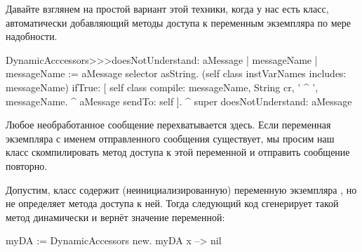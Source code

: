 \documentclass[a4paper,10pt,twoside]{book}
\begin{document}

Давайте взглянем на простой вариант этой техники, когда у нас есть класс, автоматически добавляющий методы доступа к переменным экземпляра по мере надобности.

\begin{code}{}
DynamicAcccessors>>>doesNotUnderstand: aMessage
	| messageName |
	messageName := aMessage selector asString.
	(self class instVarNames includes: messageName)
		ifTrue: [
			self class compile: messageName, String cr, ' ^ ', messageName.
			^ aMessage sendTo: self ].
	^ super doesNotUnderstand: aMessage
\end{code}
Любое необработанное сообщение перехватывается здесь. Если переменная экземпляра с именем отправленного сообщения существует, мы просим наш класс скомпилировать метод доступа к этой переменной и отправить сообщение повторно.

Допустим, класс  содержит (неинициализированную) переменную экземпляра , но не определяет метода доступа к ней. Тогда следующий код сгенерирует такой метод динамически и вернёт значение переменной:
\begin{code}{}
myDA := DynamicAccessors new.
myDA x --> nil
\end{code}
\end{document}
